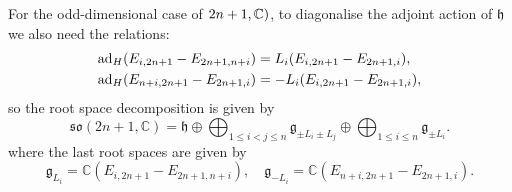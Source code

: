 \documentclass{report}
\begin{document}
For the odd-dimensional case of $\so(2n+1, \mathbb C)$, to diagonalise the adjoint action of $\mathfrak h$ we also need the relations:
\begin{align*}
    \operatorname{ad}_{H}(E_{i,2n+1} - E_{2n+1,n+i}) &= L_i(E_{i,2n+1} - E_{2n+1,i}),\\
    \operatorname{ad}_{H}(E_{n+i,2n+1} - E_{2n+1,i}) &= -L_i(E_{i,2n+1} - E_{2n+1,i}),\\
\end{align*}
so the root space decomposition is given by
\[
    \mathfrak{so}(2n+1,\mathbb C) = \mathfrak h \oplus \bigoplus_{1 \leq i < j \leq n} \mathfrak g_{\pm L_i \pm L_j} \oplus \bigoplus_{1 \leq i \leq n} \mathfrak g_{\pm L_i}.
\]
where the last root spaces are given by
\[
\mathfrak g_{L_i} = \mathbb C \left( E_{i,2n+1} - E_{2n+1,n+i} \right), \quad \mathfrak g_{-L_i} = \mathbb C \left( E_{n+i,2n+1} - E_{2n+1,i} \right).
\]
\end{document}
